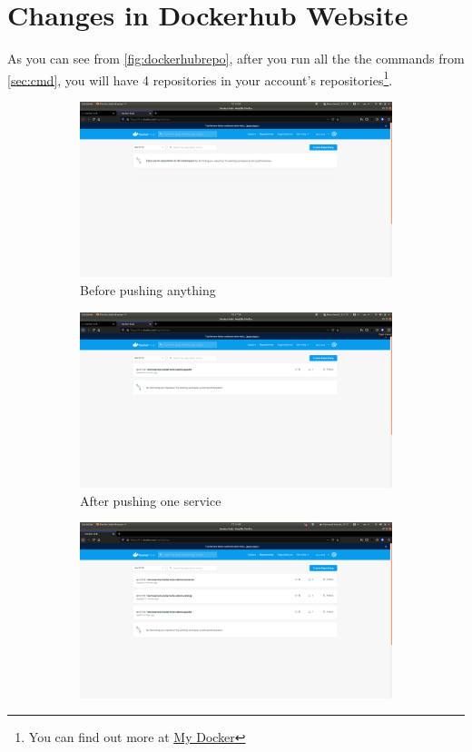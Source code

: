 \documentclass[11pt,a4paper]{report}
\begin{document}
  	\section{Changes in Dockerhub Website}
  	\label{sec:change}
  	As you can see from \ref{fig:dockerhubrepo}, after you run all the the commands from \ref{sec:cmd}, you will have 4 repositories in your account's repositories\footnote{You can find out more at \href{https://hub.docker.com/u/lam1910}{My Docker}}.
  	\begin{figure}[p]
		\centering
  		\begin{subfigure}[b]{\linewidth}
    		\includegraphics[width=\linewidth]{docker-repo-before.png}
    		\caption{Before pushing anything}
  		\end{subfigure}
  		\begin{subfigure}[b]{\linewidth}
    		\includegraphics[width=\linewidth]{docker-repo-after.png}
    		\caption{After pushing one service}
  		\end{subfigure}
  		\begin{subfigure}[b]{\linewidth}
    		\includegraphics[width=\linewidth]{docker-end-push.png}

\end{subfigure}
\end{figure}
\end{document}
